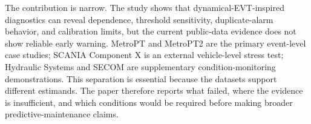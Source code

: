 The contribution is narrow. The study shows that dynamical-EVT-inspired diagnostics can reveal dependence, threshold sensitivity, duplicate-alarm behavior, and calibration limits, but the current public-data evidence does not show reliable early warning. MetroPT and MetroPT2 are the primary event-level case studies; SCANIA Component X is an external vehicle-level stress test; Hydraulic Systems and SECOM are supplementary condition-monitoring demonstrations. This separation is essential because the datasets support different estimands. The paper therefore reports what failed, where the evidence is insufficient, and which conditions would be required before making broader predictive-maintenance claims.
